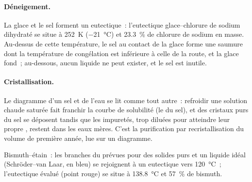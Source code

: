 \paragraph{Déneigement.} La glace et le sel forment un eutectique~: l'eutectique glace--chlorure de sodium
dihydraté se situe à \qty{252}{K} (\qty{-21}{\degreeCelsius}) et 23.3~\% de chlorure
de sodium en masse. Au-dessus de cette température, le sel au contact de la glace forme une
saumure dont la température de congélation est inférieure à celle de la route, et la glace
fond~; au-dessous, aucun liquide ne peut exister, et le sel est inutile.

\paragraph{Cristallisation.} Le diagramme d'un sel et de l'eau se lit comme tout
autre~: refroidir une solution chaude saturée fait franchir la courbe de solubilité (le
 du sel), et des cristaux purs du sel se déposent tandis que les
impuretés, trop diluées pour atteindre leur propre , restent dans les eaux mères.
C'est la purification par recristallisation du volume de première année, lue sur un
diagramme.

\begin{omfigure}

{\small Bismuth--étain~: les branches du  prévues pour des solides purs et un liquide
idéal (Schröder--van Laar, en bleu) se rejoignent à un eutectique vers
\qty{120}{\degreeCelsius}~; l'eutectique évalué (point rouge) se situe à
\qty{138.8}{\degreeCelsius} et 57~\% de bismuth.}
\end{omfigure}

